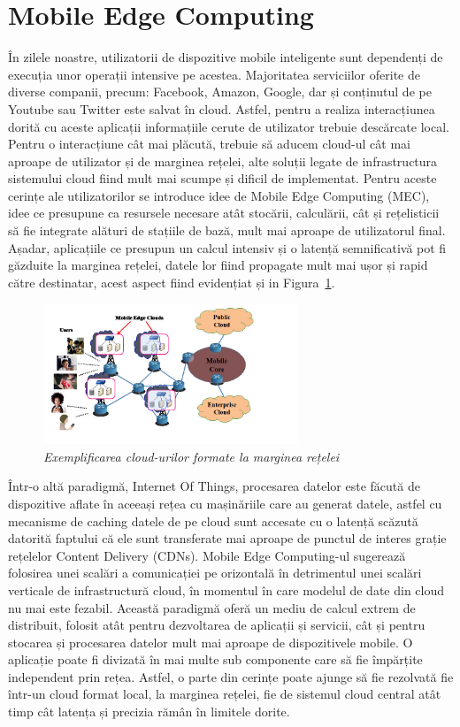 \documentclass[12pt,a4paper]{report}
\begin{document}
\section{Mobile Edge Computing} \label{mobileEdgeComputing}
În zilele noastre, utilizatorii de dispozitive mobile inteligente sunt dependenți de execuția unor operații intensive pe acestea. Majoritatea serviciilor oferite de diverse companii, precum: Facebook, Amazon, Google, dar și conținutul de pe Youtube sau Twitter este salvat în cloud. Astfel, pentru a realiza interacțiunea dorită cu aceste aplicații informațiile cerute de utilizator trebuie descărcate local. Pentru o interacțiune cât mai plăcută, trebuie să aducem cloud-ul cât mai aproape de utilizator și de marginea rețelei, alte soluții legate de infrastructura sistemului cloud fiind mult mai scumpe și dificil de implementat. Pentru aceste cerințe ale utilizatorilor se introduce idee de Mobile Edge Computing (MEC), idee ce presupune ca resursele necesare atât stocării, calculării, cât și rețelisticii să fie integrate alături de stațiile de bază, mult mai aproape de utilizatorul final. Așadar, aplicațiile ce presupun un calcul intensiv și o latență semnificativă pot fi găzduite la marginea rețelei, datele lor fiind propagate mult mai ușor și rapid către destinatar, acest aspect fiind evidențiat și in Figura~\ref{fig:pic0}.
\begin{figure}[th]
\centering
\includegraphics[width=3in]{pics/mobile-edge-computing.jpg}
  \caption{\emph{Exemplificarea cloud-urilor formate la marginea rețelei}\protect\footnotemark}
  \label{fig:pic0}
\end{figure}
Într-o altă paradigmă, Internet Of Things, procesarea datelor este făcută de dispozitive aflate în aceeași rețea cu mașinăriile care au generat datele, astfel cu mecanisme de caching datele de pe cloud sunt accesate cu o latență scăzută datorită faptului că ele sunt transferate mai aproape de punctul de interes grație rețelelor Content Delivery (CDNs). Mobile Edge Computing-ul\cite{MecSurvey} sugerează folosirea unei scalări a comunicației pe orizontală în detrimentul unei scalări verticale de infrastructură cloud, în momentul în care modelul de date din cloud nu mai este fezabil. Această paradigmă oferă un mediu de calcul extrem de distribuit, folosit atât pentru dezvoltarea de aplicații și servicii, cât și pentru stocarea și procesarea datelor mult mai aproape de dispozitivele mobile. O aplicație poate fi divizată în mai multe sub componente care să fie împărțite independent prin rețea. Astfel, o parte din cerințe poate ajunge să fie rezolvată fie într-un cloud format local, la marginea rețelei, fie de sistemul cloud central atât timp cât latența și precizia rămân în limitele dorite.
\end{document}
